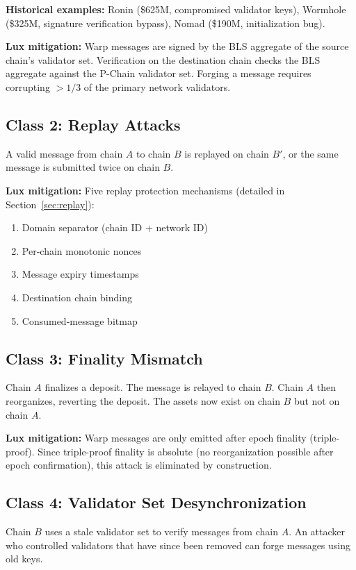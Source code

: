 \documentclass[11pt,a4paper]{article}
\begin{document}
\textbf{Historical examples:} Ronin (\$625M, compromised validator keys), Wormhole (\$325M, signature verification bypass), Nomad (\$190M, initialization bug).

\textbf{Lux mitigation:} Warp messages are signed by the BLS aggregate of the source chain's validator set. Verification on the destination chain checks the BLS aggregate against the P-Chain validator set. Forging a message requires corrupting $>1/3$ of the primary network validators.

\subsection{Class 2: Replay Attacks}

A valid message from chain $A$ to chain $B$ is replayed on chain $B'$, or the same message is submitted twice on chain $B$.

\textbf{Lux mitigation:} Five replay protection mechanisms (detailed in Section~\ref{sec:replay}):
\begin{enumerate}[leftmargin=2em]
\item Domain separator (chain ID + network ID)
\item Per-chain monotonic nonces
\item Message expiry timestamps
\item Destination chain binding
\item Consumed-message bitmap
\end{enumerate}

\subsection{Class 3: Finality Mismatch}

Chain $A$ finalizes a deposit. The message is relayed to chain $B$. Chain $A$ then reorganizes, reverting the deposit. The assets now exist on chain $B$ but not on chain $A$.

\textbf{Lux mitigation:} Warp messages are only emitted after epoch finality (triple-proof). Since triple-proof finality is absolute (no reorganization possible after epoch confirmation), this attack is eliminated by construction.

\subsection{Class 4: Validator Set Desynchronization}

Chain $B$ uses a stale validator set to verify messages from chain $A$. An attacker who controlled validators that have since been removed can forge messages using old keys.
\end{document}
